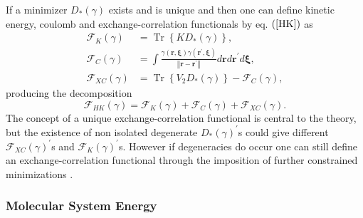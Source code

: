 \documentclass[aps,preprint]{revtex4}%
\begin{document}
If a minimizer $D_{\ast}\left(  \gamma\right)  $ exists and is unique and then
one can define kinetic energy, coulomb and exchange-correlation functionals by
eq. $\left(  \ref{HK}\right)  $ as
\begin{align}
\mathcal{F}_{K}\left(  \gamma\right)   &  =\operatorname{Tr}\left\{  KD_{\ast
}\left(  \gamma\right)  \right\}  ,\nonumber\\
\mathcal{F}_{C}\left(  \gamma\right)   &  =\int\frac{\gamma\left(
\mathbf{r,\xi}\right)  \gamma\left(  \mathbf{r}^{\prime}\mathbf{,\xi}\right)
}{\left\Vert \mathbf{r-r}^{\prime}\right\Vert }d\mathbf{r}d\mathbf{r}^{\prime
}d\mathbf{\xi},\nonumber\\
\mathcal{F}_{XC}\left(  \gamma\right)   &  =\operatorname{Tr}\left\{
V_{2}D_{\ast}\left(  \gamma\right)  \right\}  -\mathcal{F}_{C}\left(
\gamma\right)  ,
\end{align}
producing the decomposition
\begin{equation}
\mathcal{F}_{HK}\left(  \gamma\right)  =\mathcal{F}_{K}\left(  \gamma\right)
+\mathcal{F}_{C}\left(  \gamma\right)  +\mathcal{F}_{XC}\left(  \gamma\right)
.
\end{equation}
The concept of a unique exchange-correlation functional is central to the
theory, but the existence of non isolated degenerate $D_{\ast}\left(
\gamma\right)  ^{\prime}$s could give different $\mathcal{F}_{XC}\left(
\gamma\right)  ^{\prime}$s and $\mathcal{F}_{K}\left(  \gamma\right)
^{\prime}$s. However if degeneracies do occur one can still define an
exchange-correlation functional through the imposition of further constrained
minimizations \cite{weiner06}.

\subsubsection{Molecular System Energy}
\end{document}
